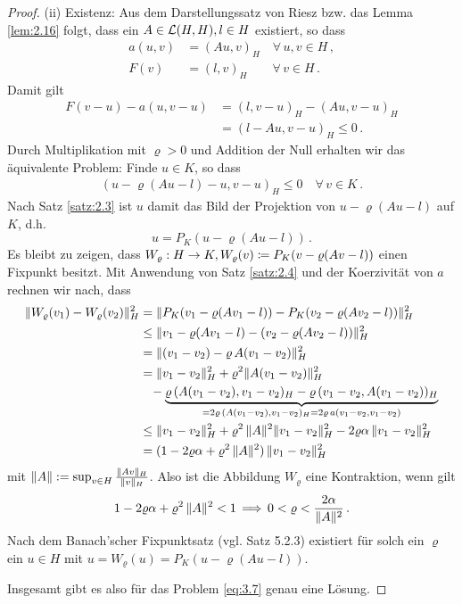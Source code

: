 \begin{proof}
(ii) Existenz: Aus dem Darstellungssatz von Riesz bzw. das Lemma \ref{lem:2.16} folgt, dass ein $A \in \mathcal L(H,H), l \in H$ existiert, so dass
\begin{align*}
	a(u,v) &= (Au,v)_H \quad \forall \, u,v \in H\, , \\
	F(v) &= (l,v)_H \qquad \forall \, v \in H \, .
\end{align*}
Damit gilt
\begin{align*}
	  F(v-u) - a(u,v-u) &= (l,v-u)_H - (Au,v-u)_H \\
	 &=   (l-Au,v-u)_H \le 0 \, .
\end{align*}
Durch Multiplikation mit $\varrho > 0$ und Addition der Null erhalten wir das äquivalente Problem: Finde $u \in K$, so dass
\begin{align}
	(u-\varrho(Au-l)-u,v-u)_H \le 0 \quad \forall \, v \in K \, .
\end{align}
Nach Satz \ref{satz:2.3} ist $u$ damit das Bild der Projektion von $u-\varrho (Au-l)$ auf $K$, d.h.
\[
	u = P_K (u-\varrho (Au-l)) \,.
\]
Es bleibt zu zeigen, dass $W_\varrho : H \rightarrow K, W_\varrho (v) \coloneqq P_K(v-\varrho (Av-l))$ einen Fixpunkt besitzt. Mit Anwendung von Satz \ref{satz:2.4} und der Koerzivität von $a$ rechnen wir nach, dass
\begin{align*}
	\lVert W_\varrho (v_1) - W_\varrho (v_2)\rVert_H^2  & = \lVert  P_K (v_1-\varrho (Av_1-l))- P_K (v_2-\varrho (Av_2-l))  \rVert_H^2 \\
	& \le \lVert v_1-\varrho (Av_1-l)- (v_2-\varrho (Av_2-l))  \rVert_H^2  \\
	& = \lVert (v_1-v_2)-\varrho \, A(v_1-v_2)  \rVert_H^2  \\
	& = \lVert v_1-v_2\rVert_H^2 + \varrho^2 \lVert A(v_1-v_2)\rVert^2_H \\
	& \ \ \, - \underbrace{ \varrho\, (A(v_1-v_2),v_1-v_2)_H - \varrho\, (v_1-v_2,A(v_1-v_2))_H}_{=2\varrho\, (A(v_1-v_2),v_1-v_2)_H  =2\varrho\, a(v_1-v_2,v_1-v_2)} \\
	& \le \lVert v_1-v_2\rVert_H^2 + \varrho^2\, \lVert A\rVert^2 \lVert v_1-v_2\rVert_H^2 - 2\varrho\alpha \, \lVert v_1-v_2\rVert_H^2 \\
	& = (1-2\varrho \alpha+\varrho^2 \, \lVert A\rVert^2) \,\lVert v_1-v_2\rVert_H^2
\end{align*}
mit $\lVert A\rVert := \sup_{v \in H} \frac{\lVert Av\rVert_H}{\lVert v\rVert_H}$. Also ist die Abbildung $W_\varrho$  eine Kontraktion, wenn gilt
\begin{align*}
	1-2\varrho \alpha+\varrho^2 \, \lVert A\rVert^2 < 1 \, \Longrightarrow\, 0 < \varrho < \frac {2\alpha}{\lVert A\rVert^2} \, .
\end{align*}
Nach dem Banach'scher Fixpunktsatz (vgl. \cite{Stoer} Satz 5.2.3) existiert für solch ein $\varrho$ ein $u \in H$ mit $u = W_\varrho (u) = P_K(u-\varrho (Au-l))$.

Insgesamt gibt es also für das Problem \eqref{eq:3.7} genau eine  Lösung.
\end{proof}

